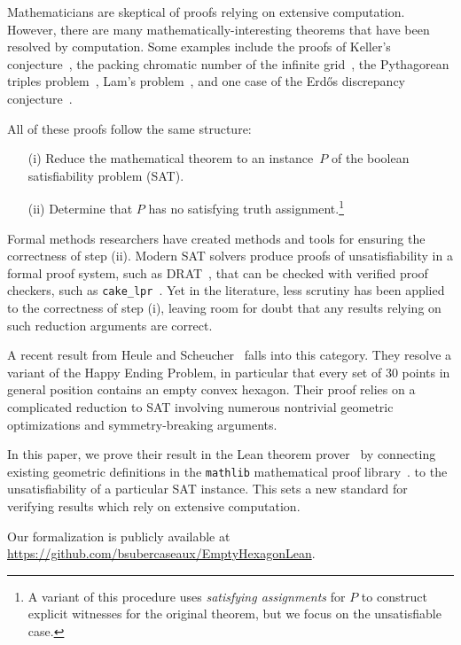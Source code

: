 Mathematicians are skeptical of proofs relying on extensive computation.
However, there are many mathematically-interesting theorems that have been resolved by computation.
Some examples include the proofs of
Keller's conjecture~\cite{brakensiek2023resolution},
the packing chromatic number of the infinite grid~\cite{Subercaseaux_Heule_2023},
the Pythagorean triples problem~\cite{Heule_2016},
Lam's problem~\cite{21bright_sat_based_resolution_lams_problem},
and one case of the Erd\H{o}s discrepancy conjecture~\cite{konev2014sat}.

All of these proofs follow the same structure:
\begin{itemize}
  \item[(i)] Reduce the mathematical theorem to an instance~$P$ of the boolean satisfiability problem (SAT).
  \item[(ii)] Determine that $P$ has no satisfying truth assignment.\footnote{
    A variant of this procedure uses \emph{satisfying assignments} for $P$ to construct explicit witnesses for the original theorem, but we focus on the unsatisfiable case.}
\end{itemize}

Formal methods researchers have created methods and tools for ensuring the correctness of step (ii).
Modern SAT solvers produce proofs of unsatisfiability in a formal proof system,
such as DRAT~\cite{drat-trim14},
that can be checked with verified proof checkers,
such as \texttt{cake\_lpr}~\cite{tanVerifiedPropagationRedundancy2023}.
Yet in the literature, less scrutiny has been applied to the correctness of step (i),
leaving room for doubt that any results relying on such reduction arguments are correct.

A recent result from Heule and Scheucher~\cite{emptyHexagonNumber} falls into this category.
They resolve a variant of the Happy Ending Problem,
in particular that every set of 30 points in general position contains an empty convex hexagon.
Their proof relies on a complicated reduction to SAT
involving numerous nontrivial geometric optimizations and symmetry-breaking arguments.

In this paper, we prove their result in the Lean theorem prover~\cite{demouraLeanTheoremProver2015}
by connecting existing geometric definitions
in the \texttt{mathlib} mathematical proof library~\cite{The_mathlib_Community_2020}.
to the unsatisfiability of a particular SAT instance.
This sets a new standard for verifying results which rely on extensive computation.

Our formalization is publicly available at \url{https://github.com/bsubercaseaux/EmptyHexagonLean}.

